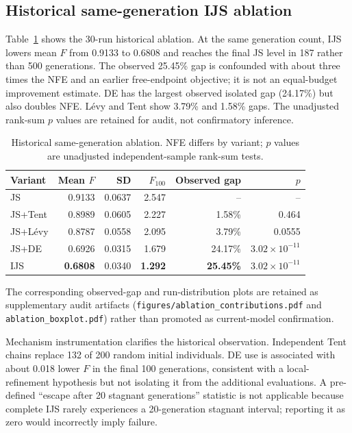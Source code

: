 \documentclass[preprint,12pt]{elsarticle}
\begin{document}
\subsection{Historical same-generation IJS ablation}\label{sec:ablation}

Table~\ref{tab:ablation} shows the 30-run historical ablation. At the same generation count, IJS lowers mean $F$ from 0.9133 to 0.6808 and reaches the final JS level in 187 rather than 500 generations. The observed 25.45\% gap is confounded with about three times the NFE and an earlier free-endpoint objective; it is not an equal-budget improvement estimate. DE has the largest observed isolated gap (24.17\%) but also doubles NFE. L\'evy and Tent show 3.79\% and 1.58\% gaps. The unadjusted rank-sum $p$ values are retained for audit, not confirmatory inference.

\begin{table}[t]
\centering
\caption{Historical same-generation ablation. NFE differs by variant; $p$ values are unadjusted independent-sample rank-sum tests.}
\label{tab:ablation}
\begin{tabular}{lrrrrr}
\toprule
Variant & Mean $F$ & SD & $F_{100}$ & Observed gap & $p$ \\
\midrule
JS & 0.9133 & 0.0637 & 2.547 & -- & -- \\
JS+Tent & 0.8989 & 0.0605 & 2.227 & 1.58\% & 0.464 \\
JS+L\'evy & 0.8787 & 0.0558 & 2.095 & 3.79\% & 0.0555 \\
JS+DE & 0.6926 & 0.0315 & 1.679 & 24.17\% & $3.02\times10^{-11}$ \\
IJS & \textbf{0.6808} & 0.0340 & \textbf{1.292} & \textbf{25.45\%} & $3.02\times10^{-11}$ \\
\bottomrule
\end{tabular}
\end{table}

The corresponding observed-gap and run-distribution plots are retained as supplementary audit artifacts (\texttt{figures/ablation\_contributions.pdf} and \texttt{ablation\_boxplot.pdf}) rather than promoted as current-model confirmation.

Mechanism instrumentation clarifies the historical observation. Independent Tent chains replace 132 of 200 random initial individuals. DE use is associated with about 0.018 lower $F$ in the final 100 generations, consistent with a local-refinement hypothesis but not isolating it from the additional evaluations. A pre-defined ``escape after 20 stagnant generations'' statistic is not applicable because complete IJS rarely experiences a 20-generation stagnant interval; reporting it as zero would incorrectly imply failure.
\end{document}
